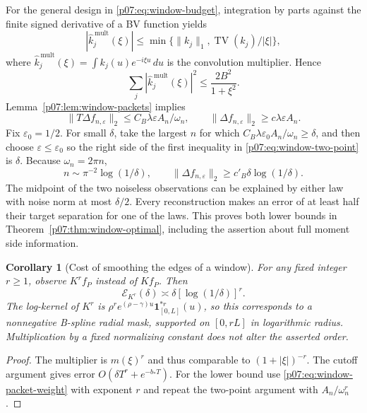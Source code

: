\documentclass[11pt,letterpaper]{article}
\newtheorem{corollary}[theorem]{Corollary}
\theoremstyle{definition}
\theoremstyle{remark}
\newcommand{\1}{\mathbf 1}
\begin{document}
For the general design in \eqref{p07:eq:window-budget}, integration by
parts against the finite signed derivative of a BV function yields
\[
 |\widehat k_j^{\,\mathrm{mult}}(\xi)|
 \le\min\{\|k_j\|_1,\operatorname{TV}(k_j)/|\xi|\},
\]
where $\widehat k_j^{\,\mathrm{mult}}(\xi)=\int k_j(u)e^{-i\xi u}\,du$
is the convolution multiplier.  Hence
\[
 \sum_j|\widehat k_j^{\,\mathrm{mult}}(\xi)|^2
                         \le \frac{2B^2}{1+\xi^2}.
\]
Lemma~\ref{p07:lem:window-packets} implies
\begin{equation}\label{p07:eq:window-two-point}
 \|T\Delta f_{n,\varepsilon}\|_2
       \le C_B\lambda\varepsilon A_n/\omega_n,
 \qquad
 \|\Delta f_{n,\varepsilon}\|_2
       \ge c\lambda\varepsilon A_n.
\end{equation}
Fix $\varepsilon_0=1/2$. For small $\delta$, take the largest $n$
for which $C_B\lambda\varepsilon_0 A_n/\omega_n\ge\delta$, and
then choose $\varepsilon\le\varepsilon_0$ so the right side of the
first inequality in \eqref{p07:eq:window-two-point} is $\delta$.
Because $\omega_n=2\pi n$,
\[
 n\sim\pi^{-2}\log(1/\delta),\qquad
 \|\Delta f_{n,\varepsilon}\|_2
                          \ge c'_B\delta\log(1/\delta).
\]
The midpoint of the two noiseless observations can be explained
by either law with noise norm at most $\delta/2$.
Every reconstruction makes an error of at least half their target
separation for one of the laws. This proves both lower bounds in
Theorem~\ref{p07:thm:window-optimal}, including the assertion about
full moment side information.

\begin{corollary}[Cost of smoothing the edges of a window]
\label{p07:cor:window-spline}
For any fixed integer $r\ge1$, observe $K^rf_P$ instead of $Kf_P$.
Then
\[
 \mathcal E_{K^r}(\delta)\asymp
                         \delta[\log(1/\delta)]^r.
\]
The log-kernel of $K^r$ is
$\rho^r e^{(\rho-\gamma)u}\mathbf1_{[0,L]}^{*r}(u)$,
so this corresponds to a nonnegative B-spline radial mask,
supported on $[0,rL]$ in logarithmic radius.  Multiplication by a
fixed normalizing constant does not alter the asserted order.
\end{corollary}
\begin{proof}
The multiplier is $m(\xi)^r$ and thus comparable to
$(1+|\xi|)^{-r}$. The cutoff argument gives error
$O(\delta T^r+e^{-b_*T})$. For the lower bound use
\eqref{p07:eq:window-packet-weight} with exponent $r$ and repeat the
two-point argument with $A_n/\omega_n^r$.
\end{proof}
\end{document}
